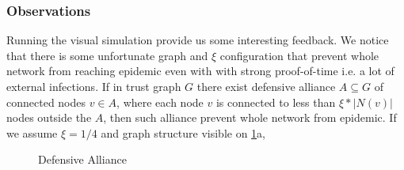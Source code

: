 \documentclass[nostrict]{szablonPG}
\begin{document}
\subsubsection{Observations}
Running the visual simulation provide us some interesting feedback. We notice that there is some unfortunate graph and $\xi$ configuration that prevent whole network from reaching epidemic even with with strong proof-of-time i.e. a lot of external infections.
If in trust graph $G$ there exist defensive alliance $A \subseteq G$ of connected nodes $v \in A$, where each node $v$ is connected to less than $\xi * |N(v)|$ nodes outside the $A$, then such alliance prevent whole network from epidemic. If we assume $\xi = 1/4$ and graph structure visible on \ref{fig:defensive-alliance}a,
\begin{figure}[h!]
 \hfill 	
\caption{Defensive Alliance}
\label{fig:defensive-alliance}
\end{figure}
\end{document}
